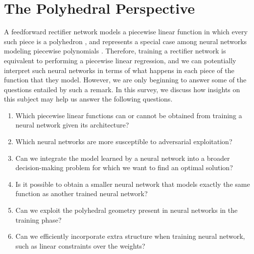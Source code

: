 

\section{The Polyhedral Perspective}\label{sec:poly}

A feedforward rectifier network models a piecewise linear function \citep{arora2018understanding} in which every such piece is a polyhedron \citep{raghu2017expressive}, 
and represents a special case among neural networks modeling piecewise polynomials \citep{balestriero2018spline}. 
Therefore, training a rectifier network is equivalent to performing a piecewise linear regression,  
and we can potentially interpret such neural networks in terms of what happens in each piece of the function that they model. 
However, we are only beginning to answer some of the questions entailed by such a remark. In this survey, we discuss how insights on this subject may help us answer the following questions.
\begin{enumerate}
\item Which piecewise linear functions can or cannot be obtained from training a neural network given its architecture?
\item Which neural networks are more susceptible to adversarial exploitation?
\item Can we integrate the model learned by a neural network into a broader decision-making problem for which we want to find an optimal solution?
\item Is it possible to obtain a smaller neural network that models exactly the same function as another trained  neural network?
\item Can we exploit the polyhedral geometry present in neural networks in the training phase? 
\item Can we efficiently incorporate extra structure when training neural network, such as linear constraints over the weights?
\end{enumerate}


